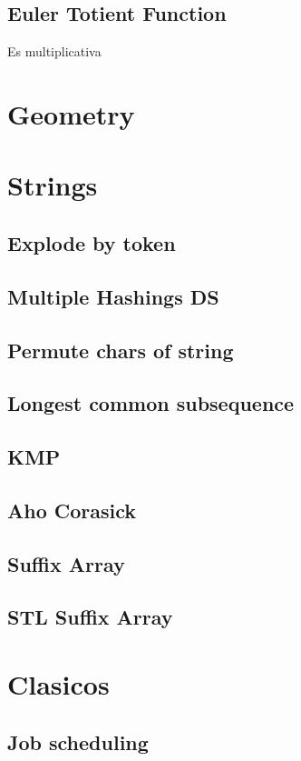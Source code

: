 \subsection{Euler Totient Function}
Es multiplicativa
\section{Geometry}


\section{Strings}
\subsection{Explode by token}
\subsection{Multiple Hashings DS}
\subsection{Permute chars of string}
\subsection{Longest common subsequence}
\subsection{KMP}
\subsection{Aho Corasick}
\subsection{Suffix Array}
\subsection{STL Suffix Array}
\section{Clasicos}
\subsection{Job scheduling}
